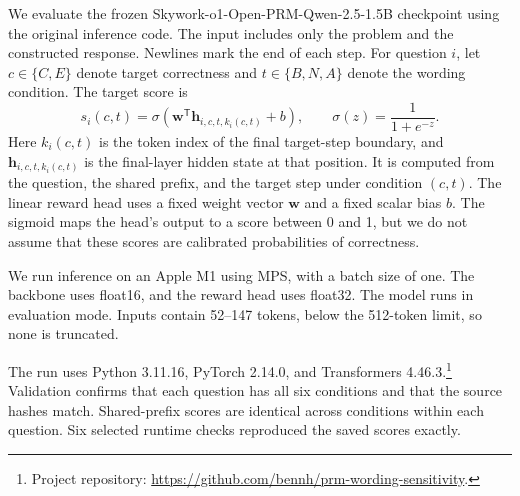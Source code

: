 We evaluate the frozen Skywork-o1-Open-PRM-Qwen-2.5-1.5B checkpoint \citep{skywork2024} using the original inference code. The input includes only the problem and the constructed response. Newlines mark the end of each step. For question $i$, let $c\in\{C,E\}$ denote target correctness and $t\in\{B,N,A\}$ denote the wording condition. The target score is
\begin{equation}
s_i(c,t)=\sigma\!\left(\mathbf{w}^{\mathsf T}\mathbf{h}_{i,c,t,k_i(c,t)}+b\right),
\qquad \sigma(z)=\frac{1}{1+e^{-z}}.
\label{eq:target_score}
\end{equation}
Here $k_i(c,t)$ is the token index of the final target-step boundary, and $\mathbf{h}_{i,c,t,k_i(c,t)}$ is the final-layer hidden state at that position. It is computed from the question, the shared prefix, and the target step under condition $(c,t)$. The linear reward head uses a fixed weight vector $\mathbf{w}$ and a fixed scalar bias $b$. The sigmoid maps the head's output to a score between 0 and 1, but we do not assume that these scores are calibrated probabilities of correctness.

We run inference on an Apple M1 using MPS, with a batch size of one. The backbone uses float16, and the reward head uses float32. The model runs in evaluation mode. Inputs contain 52--147 tokens, below the 512-token limit, so none is truncated.

The run uses Python 3.11.16, PyTorch 2.14.0, and Transformers 4.46.3.\footnote{Project repository: \url{https://github.com/bennh/prm-wording-sensitivity}.} Validation confirms that each question has all six conditions and that the source hashes match. Shared-prefix scores are identical across conditions within each question. Six selected runtime checks reproduced the saved scores exactly.

